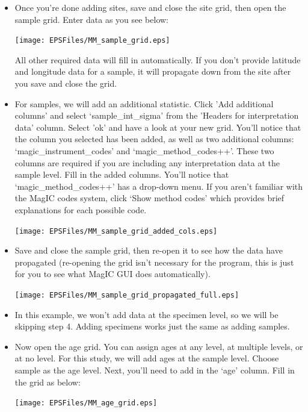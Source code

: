 \documentclass[11pt]{book}
\begin{document}
{{\begin{itemize}
    \texttt{[image: EPSFiles/MM\_site\_grid\_with\_edit\_all.eps]}

  \item Once you're done adding sites, save and close the site grid, then open the sample grid.
    Enter data as you see below:

    \texttt{[image: EPSFiles/MM\_sample\_grid.eps]}

    All other required data will fill in automatically.  If you don't provide latitude and longitude data for a sample, it will propagate down from the site after you save and close the grid.

  \item For samples, we will add an additional statistic.  Click 'Add additional columns' and select `sample\_int\_sigma' from the 'Headers for interpretation data' column.  Select 'ok' and have a look at your new grid.  You'll notice that the column you selected has been added, as well as two additional columns: `magic\_instrument\_codes' and `magic\_method\_codes++'.  These two columns are required if you are including any interpretation data at the sample level.  Fill in the added columns.  You'll notice that `magic\_method\_codes++' has a drop-down menu.  If you aren't familiar with the MagIC codes system, click `Show method codes' which provides brief explanations for each possible code.

    \texttt{[image: EPSFiles/MM\_sample\_grid\_added\_cols.eps]}

  \item Save and close the sample grid, then re-open it to see how the data have propagated (re-opening the grid isn't necessary for the program, this is just for you to see what MagIC GUI does automatically).

    \texttt{[image: EPSFiles/MM\_sample\_grid\_propagated\_full.eps]}

  \item In this example, we won't add data at the specimen level, so we will be skipping step 4.  Adding specimens works just the same as adding samples.

  \item Now open the age grid.  You can assign ages at any level, at multiple levels, or at no level.  For this study, we will add ages at the sample level.  Choose sample as the age level.  Next, you'll need to add in the `age' column.  Fill in the grid as below:

    \texttt{[image: EPSFiles/MM\_age\_grid.eps]}


\end{itemize}}}
\end{document}
